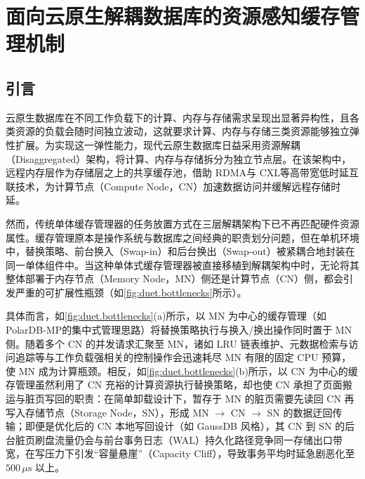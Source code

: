 \chapter{面向云原生解耦数据库的资源感知缓存管理机制\label{sec:chapter.duet}}

\section{引言}
云原生数据库在不同工作负载下的计算、内存与存储需求呈现出显著异构性，且各类资源的负载会随时间独立波动，这就要求计算、内存与存储三类资源能够独立弹性扩展。为实现这一弹性能力，现代云原生数据库日益采用资源解耦（Disaggregated）架构，将计算、内存与存储拆分为独立节点层\cite{verbitskiAmazon2017,antonopoulosSocrates2019,caoPolardb2021}。在该架构中，远程内存层作为存储层之上的共享缓存池，借助 RDMA\cite{dragojevicFarm2014,kaliaDesign2016}与 CXL\cite{goukDirectcxl2022,liPond2023}等高带宽低时延互联技术，为计算节点（Compute Node，CN）加速数据访问并缓解远程存储时延。

然而，传统单体缓存管理器的任务放置方式在三层解耦架构下已不再匹配硬件资源属性。缓存管理原本是操作系统与数据库之间经典的职责划分问题\cite{stonebrakerOperating1981}，但在单机环境中，替换策略、前台换入（Swap-in）和后台换出（Swap-out）被紧耦合地封装在同一单体组件中\cite{grayTransaction1993,leisLeanstore2018}。当这种单体式缓存管理器被直接移植到解耦架构中时，无论将其整体部署于内存节点（Memory Node，MN）侧还是计算节点（CN）侧，都会引发严重的可扩展性瓶颈（如\autoref{fig:duet.bottlenecks}所示）。

具体而言，如\autoref{fig:duet.bottlenecks}(a)所示，以 MN 为中心的缓存管理（如 PolarDB-MP\cite{yangPolardb2024}的集中式管理思路）将替换策略执行与换入/换出操作同时置于 MN 侧。随着多个 CN 的并发请求汇聚至 MN，诸如 LRU 链表维护、元数据检索与访问追踪等与工作负载强相关的控制操作会迅速耗尽 MN 有限的固定 CPU 预算，使 MN 成为计算瓶颈\cite{caoPolardb2021,zhangTowards2021}。相反，如\autoref{fig:duet.bottlenecks}(b)所示，以 CN 为中心的缓存管理虽然利用了 CN 充裕的计算资源执行替换策略，却也使 CN 承担了页面搬运与脏页写回的职责：在简单卸载设计下，暂存于 MN 的脏页需要先读回 CN 再写入存储节点（Storage Node，SN），形成 MN $\rightarrow$ CN $\rightarrow$ SN 的数据迂回传输\cite{guEfficient2017,ruanAifm2020,weinerTmo2022}；即便是优化后的 CN 本地写回设计（如 GaussDB 风格\cite{liGaussdb2024}），其 CN 到 SN 的后台脏页刷盘流量仍会与前台事务日志（WAL）持久化路径竞争同一存储出口带宽\cite{verbitskiAmazon2017,antonopoulosSocrates2019,aguileraRemote2018}，在写压力下引发“容量悬崖”（Capacity Cliff），导致事务平均时延急剧恶化至 $500\,\mu\text{s}$ 以上。

